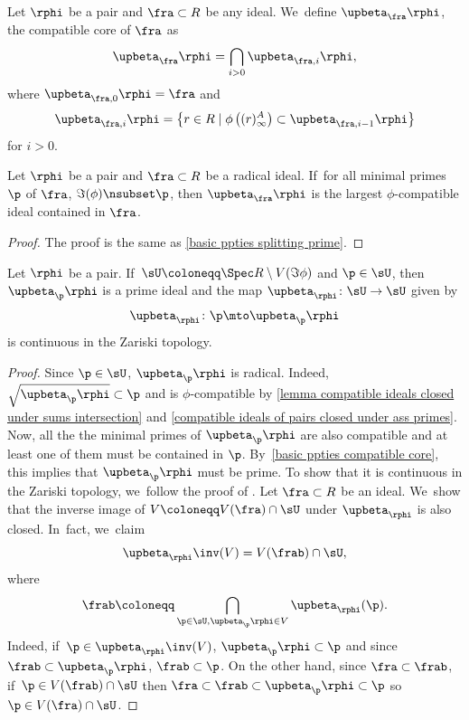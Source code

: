 \begin{definition}
Let $\rphi$ be a pair and $\fra\subset R$ be any ideal. We~define $\upbeta_\fra\rphi$, the compatible core of $\fra$ as
\[
\upbeta_\fra\rphi=\bigcap_{i>0}\upbeta_{\fra,i}\rphi,
\]
where $\upbeta_{\fra,0}\rphi=\fra$ and
\[
\upbeta_{\fra,i}\rphi=\left\{r\in R\mid \phi\left((r)^A_\infty\right)\subset \upbeta_{\fra,i-1}\rphi\right\}
\]
for $i>0$.
\end{definition}

\begin{proposition}\label{basic ppties compatible core}
Let $\rphi$ be a pair and $\fra\subset R$ be a radical ideal. If~for all minimal primes $\p$ of $\fra$, $\Im(\phi)\nsubset \p$, then
$\upbeta_\fra\rphi$ is the largest $\phi$-compatible ideal contained in $\fra$.
\end{proposition}

\begin{proof}
The proof is the same as \autoref{basic ppties splitting prime}.
\end{proof}

\begin{proposition}\label{compatible core as a map}
Let $\rphi$ be a pair. If~$\sU\coloneqq\Spec R\setminus V(\Im\phi)$ and $\p\in \sU$, then $\upbeta_\p\rphi$ is a prime ideal and the map $\upbeta_{\rphi}\colon \sU \to \sU$ given by
\[
\upbeta_{\rphi}\colon \p \mto \upbeta_\p\rphi
\]
is continuous in the Zariski topology.
\end{proposition}

\begin{proof}
Since $\p\in \sU$, $\upbeta_\p\rphi$ is radical. Indeed, $\sqrt{\upbeta_\p\rphi}\subset \p$ and is $\phi$-compatible by \autoref{lemma compatible ideals closed under sums intersection} and \autoref{compatible ideals of pairs closed under ass primes}. Now, all the the minimal primes of $\upbeta_\p\rphi$ are also compatible and at least one of them must be contained in $\p$. By~\autoref{basic ppties compatible core}, this implies that $\upbeta_\p\rphi$ must be prime. To show that it is continuous in the Zariski topology, we~follow the proof of \cite[Th.\,3.23]{BrosowskyCartierCoreMap}. Let $\fra\subset R$ be an ideal. We~show that the inverse image of $V\coloneqq V(\fra)\cap \sU$ under $\upbeta_{\rphi}$ is also closed. In~fact, we~claim
\[
\upbeta_{\rphi}\inv(V)= V(\frab)\cap \sU,
\]
where
\[
\frab\coloneqq \bigcap_{\p\in \sU,\upbeta_\p\rphi\in V} \upbeta_{\rphi}(\p).
\]
Indeed, if~$\p\in \upbeta_{\rphi}\inv(V)$, $\upbeta_\p\rphi\subset \p$ and since $\frab\subset \upbeta_\p\rphi$, $\frab\subset \p$. On the other hand, since $\fra\subset\frab$, if~$\p\in V(\frab)\cap \sU$ then $\fra\subset\frab\subset \upbeta_\p\rphi\subset \p$ so $\p\in V(\fra)\cap \sU$.
\end{proof}

